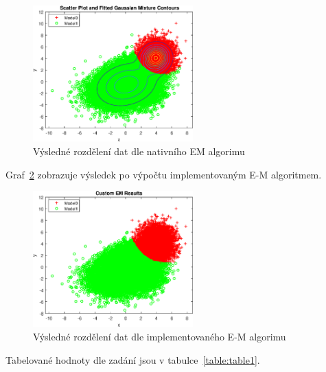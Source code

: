 \begin{figure}[htb]
    \centering
    \includegraphics[width=0.55\textwidth]{graphs/fig2.eps}
    \caption{Výsledné rozdělení dat dle nativního EM algorimu}
    \label{fig:result2}
\end{figure}
\FloatBarrier

Graf~\ref{fig:result3} zobrazuje výsledek po výpočtu implementovaným E-M algoritmem.

\begin{figure}[htb]
    \centering
    \includegraphics[width=0.55\textwidth]{graphs/fig3.eps}
    \caption{Výsledné rozdělení dat dle implementovaného E-M algorimu}
    \label{fig:result3}
\end{figure}
\FloatBarrier

Tabelované hodnoty dle zadání jsou v tabulce~\ref{table:table1}.

